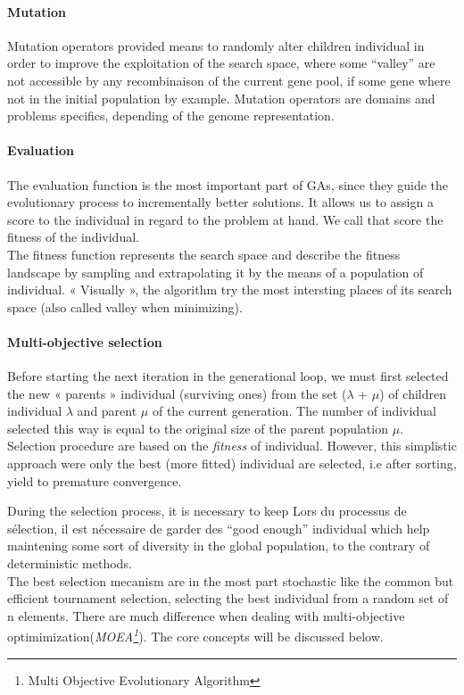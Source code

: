 \documentclass[12pt]{memoir}
\begin{document}
\paragraph{Mutation} %
\label{par:Mutation}

Mutation operators provided means to randomly alter children  individual in order to improve the exploitation of the search space, where some “valley” are not accessible by any recombinaison of the current gene pool, if some gene where not in the initial population by example.
Mutation operators are domains and problems specifics, depending of the genome representation.

\paragraph{Evaluation} %
\label{par:Evaluation}
The evaluation function is the most important part of GAs, since they guide the evolutionary process to incrementally better solutions. It allows us to assign a score to the individual in regard to the problem at hand. We call that score the fitness of the individual. \\
The fitness function represents the search space and describe the fitness landscape by sampling and extrapolating it by the means of a population of individual. « Visually », the algorithm try the most intersting places of its search space (also called valley when minimizing).


\paragraph{Multi-objective selection } %

Before starting the next iteration in the generational loop, we must first selected the new « parents
» individual (surviving ones) from the set ($\lambda$ + $\mu$) of children individual $\lambda$ and parent $\mu$ of the current generation. The number of individual selected this way is equal to the original size of the parent population  $\mu$. \\
Selection procedure are based on the \emph{fitness} of individual. However, this simplistic approach were only the best (more fitted) individual are selected, i.e after sorting, yield to premature convergence.


\bigskip
During the selection process, it is necessary to keep  
Lors du processus de sélection, il est nécessaire de garder des ``good enough\cite{sharma2010archived,deb2002fast}'' individual which help maintening some sort of diversity in the global population, to the contrary of deterministic methods. \\
The best selection mecanism are in the most part stochastic like the common but efficient tournament selection, selecting the best individual from a random set of n elements. 
There are much difference when dealing with multi-objective optimimization(\emph{MOEA\footnote{Multi Objective Evolutionary Algorithm}}). The core concepts will be discussed below.
\end{document}

